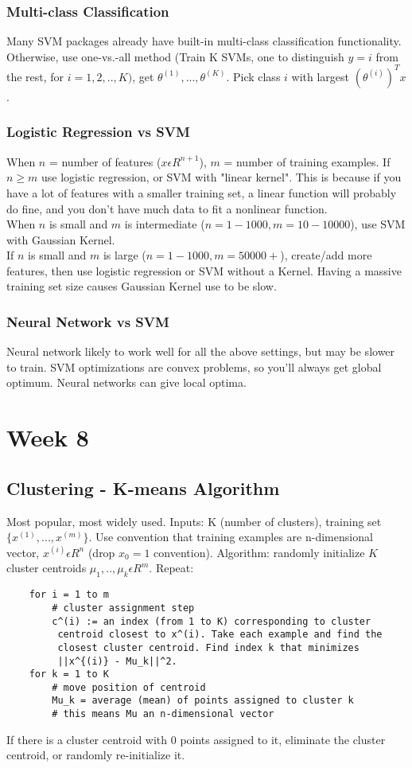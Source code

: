 \documentclass[11pt,letterpaper]{article}
\begin{document}
\subsubsection{Multi-class Classification}
Many SVM packages already have built-in multi-class classification functionality. Otherwise, use one-vs.-all method (Train K SVMs, one to distinguish $y=i$ from the rest, for $i = 1,2,..,K)$, get $\theta^{(1)},...,\theta^{(K)}$. Pick class $i$ with largest $(\theta^{(i)})^Tx$.
\subsubsection{Logistic Regression vs SVM}
When $n$ = number of features ($x \epsilon R^{n+1}$), $m$ = number of training examples. If $n \geq m$ use logistic regression, or SVM with "linear kernel". This is because if you have a lot of features with a smaller training set, a linear function will probably do fine, and you don't have much data to fit a nonlinear function.\\
When $n$ is small and $m$ is intermediate ($n=1-1000, m=10-10000$), use SVM with Gaussian Kernel. \\
If $n$ is small and $m$ is large ($n=1-1000, m=50000+$), create/add more features, then use logistic regression or SVM without a Kernel. Having a massive training set size causes Gaussian Kernel use to be slow.
\subsubsection{Neural Network vs SVM}
Neural network likely to work well for all the above settings, but may be slower to train. SVM optimizations are convex problems, so you'll always get global optimum. Neural networks can give local optima.

\section{Week 8}
\subsection{Clustering - K-means Algorithm}
Most popular, most widely used. Inputs: K (number of clusters), training set $\{x^{(1)},...,x^{(m)}\}$. Use convention that training examples are n-dimensional vector, $x^{(i)} \epsilon R^n$ (drop $x_0 = 1$ convention). Algorithm: randomly initialize $K$ cluster centroids $\mu_1,..,\mu_k \epsilon R^m$. Repeat:
\begin{lstlisting}
	for i = 1 to m
		# cluster assignment step
		c^(i) := an index (from 1 to K) corresponding to cluster
		 centroid closest to x^(i). Take each example and find the
		 closest cluster centroid. Find index k that minimizes 
		 ||x^{(i)} - Mu_k||^2.
	for k = 1 to K
		# move position of centroid
		Mu_k = average (mean) of points assigned to cluster k
		# this means Mu an n-dimensional vector 
\end{lstlisting}
If there is a cluster centroid with 0 points assigned to it, eliminate the cluster centroid, or randomly re-initialize it.
\end{document}
